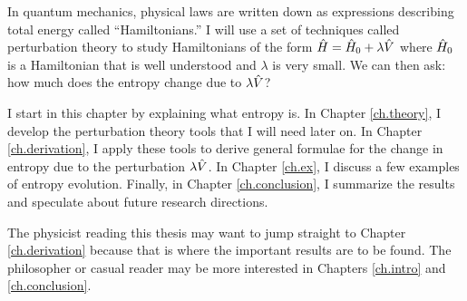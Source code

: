
In quantum mechanics, physical laws are written down as expressions describing total energy called ``Hamiltonians.'' I will use a set of techniques called perturbation theory to study Hamiltonians of the form \(\hat{H} = \hat{H}_0 + \lambda \hat{V}\) where \(\hat{H}_0\) is a Hamiltonian that is well understood and \(\lambda\) is very small. We can then ask: how much does the entropy change due to \(\lambda \hat{V}\)?

I start in this chapter by explaining what entropy is. In Chapter \ref{ch.theory}, I develop the perturbation theory tools that I will need later on. In Chapter \ref{ch.derivation}, I apply these tools to derive general formulae for the change in entropy due to the perturbation \(\lambda \hat{V}\). In Chapter \ref{ch.ex}, I discuss a few examples of entropy evolution. Finally, in Chapter \ref{ch.conclusion}, I summarize the results and speculate about future research directions.

The physicist reading this thesis may want to jump straight to Chapter \ref{ch.derivation} because that is where the important results are to be found. The philosopher or casual reader may be more interested in Chapters \ref{ch.intro} and \ref{ch.conclusion}.
